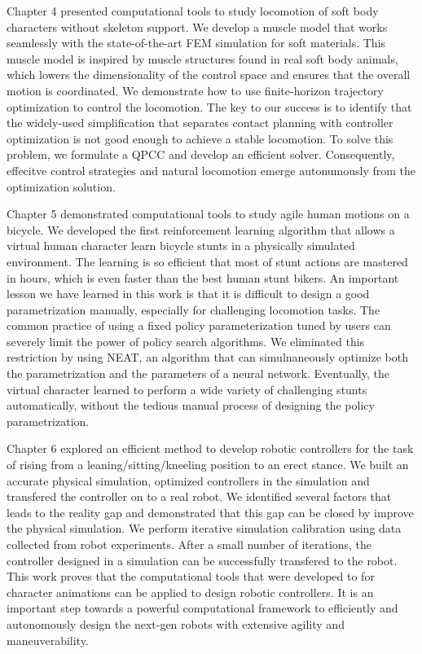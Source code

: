 Chapter 4 presented computational tools to study locomotion of soft body characters without skeleton support. We develop a muscle model that works seamlessly with the state-of-the-art FEM simulation for soft materials. This muscle model is inspired by muscle structures found in real soft body animals, which lowers the dimensionality of the control space and ensures that the overall motion is coordinated. We demonstrate how to use finite-horizon trajectory optimization to control the locomotion. The key to our success is to identify that the widely-used simplification that separates contact planning with controller optimization is not good enough to achieve a stable locomotion. To solve this problem, we formulate a QPCC and develop an efficient solver. Consequently, effecitve control strategies and natural locomotion emerge autonumously from the optimization solution.

Chapter 5 demonstrated computational tools to study agile human motions on a bicycle. We developed the first reinforcement learning algorithm that allows a virtual human character learn bicycle stunts in a physically simulated environment. The learning is so efficient that most of stunt actions are mastered in hours, which is even faster than the best human stunt bikers. An important lesson we have learned in this work is that it is difficult to design a good parametrization manually, especially for challenging locomotion tasks. The common practice of using a fixed policy parameterization tuned by users can severely limit the power of policy search algorithms. We eliminated this restriction by using NEAT, an algorithm that can simulnaneously optimize both the parametrization and the parameters of a neural network. Eventually, the virtual character learned to perform a wide variety of challenging stunts automatically, without the tedious manual process of designing the policy parametrization.

Chapter 6 explored an efficient method to develop robotic controllers for the task of rising from a leaning/sitting/kneeling position to an erect stance. We built an accurate physical simulation, optimized controllers in the simulation and transfered the controller on to a real robot. We identified several factors that leads to the reality gap and demonstrated that this gap can be closed by improve the physical simulation. We perform iterative simulation calibration using data collected from robot experiments. After a small number of iterations, the controller designed in a simulation can be successfully transfered to the robot. This work proves that the computational tools that were developed to for character animations can be applied to design robotic controllers. It is an important step towards a powerful computational framework to efficiently and autonomously design the next-gen robots with extensive agility and maneuverability.

